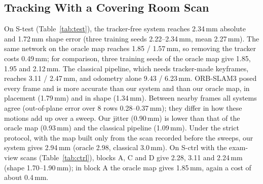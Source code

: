 \documentclass[journal]{IEEEtran}
\newcommand{\Stest}{S-test}
\newcommand{\Sctrl}{S-ctrl}
\begin{document}
\subsection{Tracking With a Covering Room Scan}
\label{sec:res_main}
On \Stest{} (Table~\ref{tab:test}), the tracker-free system reaches 2.34\,mm absolute and 1.72\,mm shape error (three training seeds 2.22--2.34\,mm, mean 2.27\,mm). The same network on the oracle map reaches 1.85 / 1.57\,mm, so removing the tracker costs 0.49\,mm; for comparison, three training seeds of the oracle map give 1.85, 1.95 and 2.12\,mm. The classical pipeline, which needs tracker-made keyframes, reaches 3.11 / 2.47\,mm, and odometry alone 9.43 / 6.23\,mm. ORB-SLAM3 posed every frame and is more accurate than our system and than our oracle map, in placement (1.79\,mm) and in shape (1.34\,mm). Between nearby frames all systems agree (out-of-plane error over 8 rows 0.28--0.37\,mm); they differ in how these motions add up over a sweep. Our jitter (0.90\,mm) is lower than that of the oracle map (0.93\,mm) and the classical pipeline (1.09\,mm). Under the strict protocol, with the map built only from the scan recorded before the sweeps, our system gives 2.94\,mm (oracle 2.98, classical 3.0\,mm). On \Sctrl{} with the exam-view scans (Table~\ref{tab:ctrl}), blocks A, C and D give 2.28, 3.11 and 2.24\,mm (shape 1.70--1.90\,mm); in block A the oracle map gives 1.85\,mm, again a cost of about 0.4\,mm.
\end{document}
